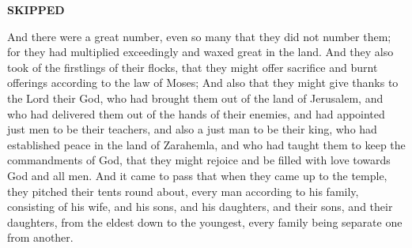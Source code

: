 \bchapter \textbf{SKIPPED}
\bverse \iffalse And it came to pass that after Mosiah had done as his father had commanded him, and had made a proclamation throughout all the land, that the people gathered themselves together throughout all the land, that they might go up to the temple to hear the words which king Benjamin should speak unto them. \fi

\bverse \iffalse And there were a great number, even so many that they did not number them; for they had multiplied exceedingly and waxed great in the land. \fi
And there were a great number, even so many that they did not number them; for they had multiplied exceedingly and waxed great in the land.
\bverse \iffalse And they also took of the firstlings of their flocks, that they might offer sacrifice and burnt offerings according to the law of Moses; \fi
And they also took of the firstlings of their flocks, that they might offer sacrifice and burnt offerings according to the law of Moses;
\bverse \iffalse And also that they might give thanks to the Lord their God, who had brought them out of the land of Jerusalem, and who had delivered them out of the hands of their enemies, and had appointed just men to be their teachers, and also a just man to be their king, who had established peace in the land of Zarahemla, and who had taught them to keep the commandments of God, that they might rejoice and be filled with love towards God and all men. \fi
And also that they might give thanks to the Lord their God, who had brought them out of the land of Jerusalem, and who had delivered them out of the hands of their enemies, and had appointed just men to be their teachers, and also a just man to be their king, who had established peace in the land of Zarahemla, and who had taught them to keep the commandments of God, that they might rejoice and be filled with love towards God and all men.
\bverse \iffalse And it came to pass that when they came up to the temple, they pitched their tents round about, every man according to his family, consisting of his wife, and his sons, and his daughters, and their sons, and their daughters, from the eldest down to the youngest, every family being separate one from another. \fi
And it came to pass that when they came up to the temple, they pitched their tents round about, every man according to his family, consisting of his wife, and his sons, and his daughters, and their sons, and their daughters, from the eldest down to the youngest, every family being separate one from another.
